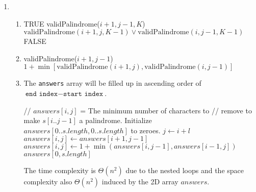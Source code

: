 \documentclass{article}
\begin{document}
\begin{enumerate}[resume]
    \item \begin{enumerate}
        \item \begin{algorithmic}[1]
                    \State \Return TRUE
                    \State \Return validPalindrome($i + 1, j - 1, K$)
                    \State \Return $\mathrm{validPalindrome}(i + 1, j, K - 1) \lor \mathrm{validPalindrome}(i, j - 1, K - 1)$
                \Else
                    \State \Return FALSE
                \EndIf
            \EndFunction
        \end{algorithmic}

        \item \begin{algorithmic}[1]
                    \State {}
                    \State \Return validPalindrome($i + 1, j - 1$)
                \Else
                    \State \Return $1 + \min[\mathrm{validPalindrome}(i + 1, j), \mathrm{validPalindrome}(i, j - 1)]$
                \EndIf
            \EndFunction
        \end{algorithmic}

        \item The \texttt{answers} array will be filled up in ascending order of $\texttt{end index} - \texttt{start index}$.
        \begin{algorithmic}[1]
            \State // $answers[i, j]$ = The minimum number of characters to
            \State // remove to make $s[i..j - 1]$ a palindrome.
            \State Initialize $answers[0..s.length, 0..s.length]$ to zeroes.
                    \State $j \gets i + l$
                        \State $answers[i, j] \gets answers[i + 1, j - 1]$
                    \Else
                        \State $answers[i, j] \gets 1 + \min(answers[i, j - 1], answers[i - 1, j])$
                    \EndIf
                \EndFor
            \EndFor
            \State \Return $answers[0, s.length]$
        \end{algorithmic}

        The time complexity is $\Theta(n^2)$ due to the nested loops and the space complexity also $\Theta(n^2)$ induced by the 2D array $answers$.
    \end{enumerate}
\end{enumerate}
\end{document}
